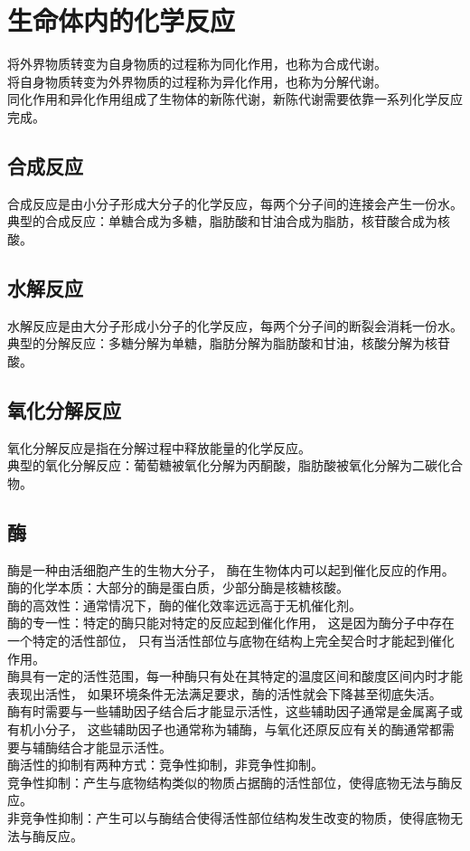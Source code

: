 \documentclass[UTF8]{ctexart}
\begin{document}
\newpage

\section{生命体内的化学反应}
    将外界物质转变为自身物质的过程称为同化作用，也称为合成代谢。\\[3mm]
    将自身物质转变为外界物质的过程称为异化作用，也称为分解代谢。\\[3mm]
    同化作用和异化作用组成了生物体的新陈代谢，新陈代谢需要依靠一系列化学反应完成。

\subsection{合成反应}
    合成反应是由小分子形成大分子的化学反应，每两个分子间的连接会产生一份水。\\[3mm]
    典型的合成反应：单糖合成为多糖，脂肪酸和甘油合成为脂肪，核苷酸合成为核酸。

\subsection{水解反应}
    水解反应是由大分子形成小分子的化学反应，每两个分子间的断裂会消耗一份水。\\[3mm]
    典型的分解反应：多糖分解为单糖，脂肪分解为脂肪酸和甘油，核酸分解为核苷酸。

\subsection{氧化分解反应}
    氧化分解反应是指在分解过程中释放能量的化学反应。\\[3mm]
    典型的氧化分解反应：葡萄糖被氧化分解为丙酮酸，脂肪酸被氧化分解为二碳化合物。

\subsection{酶}
    酶是一种由活细胞产生的生物大分子，
    酶在生物体内可以起到催化反应的作用。\\[3mm]
    酶的化学本质：大部分的酶是蛋白质，少部分酶是核糖核酸。\\[3mm]
    酶的高效性：通常情况下，酶的催化效率远远高于无机催化剂。\\[3mm]
    酶的专一性：特定的酶只能对特定的反应起到催化作用，
    这是因为酶分子中存在一个特定的活性部位，
    只有当活性部位与底物在结构上完全契合时才能起到催化作用。\\[3mm]
    酶具有一定的活性范围，每一种酶只有处在其特定的温度区间和酸度区间内时才能表现出活性，
    如果环境条件无法满足要求，酶的活性就会下降甚至彻底失活。\\[3mm]
    酶有时需要与一些辅助因子结合后才能显示活性，这些辅助因子通常是金属离子或有机小分子，
    这些辅助因子也通常称为辅酶，与氧化还原反应有关的酶通常都需要与辅酶结合才能显示活性。\\[3mm]
    酶活性的抑制有两种方式：竞争性抑制，非竞争性抑制。\\[3mm]
    竞争性抑制：产生与底物结构类似的物质占据酶的活性部位，使得底物无法与酶反应。\\[3mm]
    非竞争性抑制：产生可以与酶结合使得活性部位结构发生改变的物质，使得底物无法与酶反应。
\end{document}
